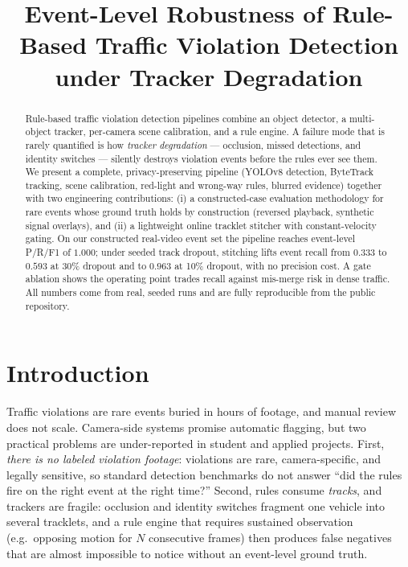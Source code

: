 \documentclass[conference]{IEEEtran}
\title{Event-Level Robustness of Rule-Based Traffic Violation Detection
under Tracker Degradation}
\author{\IEEEauthorblockN{Rakib Islam}
\IEEEauthorblockA{\textit{Department of Computer Science and Engineering}\\
Dhaka, Bangladesh \\
rakibislam4913@gmail.com}}
\begin{document}
\maketitle

\begin{abstract}
Rule-based traffic violation detection pipelines combine an object detector,
a multi-object tracker, per-camera scene calibration, and a rule engine.
A failure mode that is rarely quantified is how \emph{tracker degradation} ---
occlusion, missed detections, and identity switches --- silently destroys
violation events before the rules ever see them. We present a complete,
privacy-preserving pipeline (YOLOv8 detection, ByteTrack tracking, scene
calibration, red-light and wrong-way rules, blurred evidence) together with
two engineering contributions: (i) a constructed-case evaluation methodology
for rare events whose ground truth holds by construction (reversed playback,
synthetic signal overlays), and (ii) a lightweight online tracklet stitcher
with constant-velocity gating. On our constructed real-video event set the
pipeline reaches event-level P/R/F1 of $1.000$; under seeded track dropout,
stitching lifts event recall from $0.333$ to $0.593$ at 30\% dropout and to
$0.963$ at 10\% dropout, with no precision cost. A gate ablation shows the
operating point trades recall against mis-merge risk in dense traffic. All
numbers come from real, seeded runs and are fully reproducible from the
public repository.
\end{abstract}

\section{Introduction}
Traffic violations are rare events buried in hours of footage, and manual
review does not scale. Camera-side systems promise automatic flagging, but
two practical problems are under-reported in student and applied projects.
First, \emph{there is no labeled violation footage}: violations are rare,
camera-specific, and legally sensitive, so standard detection benchmarks do
not answer ``did the rules fire on the right event at the right time?''
Second, rules consume \emph{tracks}, and trackers are fragile: occlusion and
identity switches fragment one vehicle into several tracklets, and a rule
engine that requires sustained observation (e.g.\ opposing motion for $N$
consecutive frames) then produces false negatives that are almost impossible
to notice without an event-level ground truth.
\end{document}
